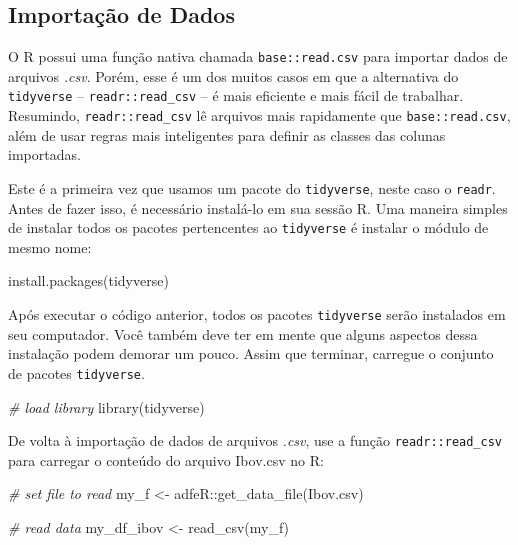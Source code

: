 \documentclass[
  11pt,
]{book}
\newenvironment{Shaded}{\begin{snugshade}}{\end{snugshade}}
\newcommand{\CommentTok}[1]{\textcolor[rgb]{0.37,0.37,0.37}{\textit{#1}}}
\newcommand{\FunctionTok}[1]{\textcolor[rgb]{0,0,0}{#1}}
\newcommand{\NormalTok}[1]{#1}
\newcommand{\OtherTok}[1]{\textcolor[rgb]{0.37,0.37,0.37}{#1}}
\newcommand{\SpecialCharTok}[1]{\textcolor[rgb]{0,0,0}{#1}}
\newcommand{\StringTok}[1]{\textcolor[rgb]{0.5,0.5,0.5}{#1}}
\begin{document}
\hypertarget{importauxe7uxe3o-de-dados}{%
\subsection{Importação de Dados}\label{importauxe7uxe3o-de-dados}}

O R possui uma função nativa chamada \texttt{base::read.csv} para importar dados de arquivos \emph{.csv}. Porém, esse é um dos muitos casos em que a alternativa do \texttt{tidyverse} -- \texttt{readr::read\_csv} -- é mais eficiente e mais fácil de trabalhar. Resumindo, \texttt{readr::read\_csv} lê arquivos mais rapidamente que \texttt{base::read.csv}, além de usar regras mais inteligentes para definir as classes das colunas importadas.

Este é a primeira vez que usamos um pacote do \texttt{tidyverse}, neste caso o \texttt{readr}. Antes de fazer isso, é necessário instalá-lo em sua sessão R. Uma maneira simples de instalar todos os pacotes pertencentes ao \texttt{tidyverse} é instalar o módulo de mesmo nome:

\begin{Shaded}
\begin{Highlighting}[]
\FunctionTok{install.packages}\NormalTok{(}\StringTok{\textquotesingle{}tidyverse\textquotesingle{}}\NormalTok{)}
\end{Highlighting}
\end{Shaded}

Após executar o código anterior, todos os pacotes \texttt{tidyverse} serão instalados em seu computador. Você também deve ter em mente que alguns aspectos dessa instalação podem demorar um pouco. Assim que terminar, carregue o conjunto de pacotes \texttt{tidyverse}.

\begin{Shaded}
\begin{Highlighting}[]
\CommentTok{\# load library}
\FunctionTok{library}\NormalTok{(tidyverse)}
\end{Highlighting}
\end{Shaded}

De volta à importação de dados de arquivos \emph{.csv}, use a função \texttt{readr::read\_csv} para carregar o conteúdo do arquivo Ibov.csv no R:  

\begin{Shaded}
\begin{Highlighting}[]
\CommentTok{\# set file to read}
\NormalTok{my\_f }\OtherTok{\textless{}{-}}\NormalTok{ adfeR}\SpecialCharTok{::}\FunctionTok{get\_data\_file}\NormalTok{(}\StringTok{\textquotesingle{}Ibov.csv\textquotesingle{}}\NormalTok{)}

\CommentTok{\# read data}
\NormalTok{my\_df\_ibov }\OtherTok{\textless{}{-}} \FunctionTok{read\_csv}\NormalTok{(my\_f)}
\end{Highlighting}
\end{Shaded}
\end{document}
